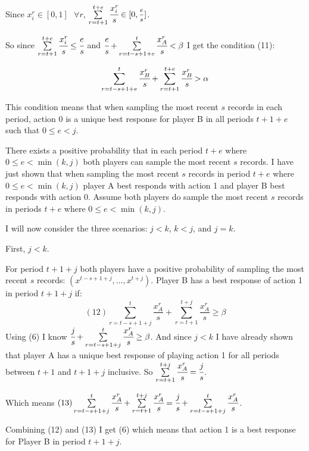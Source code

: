 \documentclass{article}
\begin{document}
Since $x_i^r \in [0,1] \hspace{8pt} \forall r$, $\sum\limits_{r=t+1}^{t+e} \cfrac{x^r_i}{s} \in [0,\mfrac{e}{s}]$.

So since $\sum\limits_{r=t+1}^{t+e} \cfrac{x^r_i}{s} \leq \cfrac{e}{s}$ and $\cfrac{e}{s}+\sum\limits_{r=t-s+1+e}^{t} \cfrac{x^r_A}{s} < \beta$ I get the condition (11):

$$\sum\limits_{r=t-s+1+e}^{t}\cfrac{x^r_B}{s}+\sum\limits_{r=t+1}^{t+e} \cfrac{x^r_B}{s} > \alpha$$

This condition means that when sampling the most recent $s$ records in each period, action 0 is a unique best response for player B in all periods $t+1+e$ such that $0 \leq e<j$.

\vskip12pt

There exists a positive probability that in each period $t+e$ where $0 \leq e<\min (k,j)$ both players can sample the most recent $s$ records. I have just shown that when sampling the most recent $s$ records in period $t+e$ where $0 \leq e<\min (k,j)$ player A best responds with action 1 and player B best responds with action 0. Assume both players do sample the most recent $s$ records in periods $t+e$ where $0 \leq e<\min (k,j)$.

\vskip12pt

I will now consider the three scenarios: $j<k$, $k<j$, and $j=k$.

\vskip12pt

First, $j<k$. 

\vskip6pt

For period $t+1+j$ both players have a positive probability of sampling the most recent $s$ records: $(x^{t-s+1+j},...,x^{t+j})$. Player B has a best response of action 1 in period $t+1+j$ if:
$$(12) \sum\limits_{r=t-s+1+j}^{t}\frac{x^r_A}{s}+\sum\limits_{r=t+1}^{t+j} \frac{x^r_A}{s} \geq \beta$$
Using (6) I know $\cfrac{j}{s}+\sum\limits_{r=t-s+1+j}^{t}\cfrac{x^r_A}{s} \geq \beta$. And since $j<k$ I have already shown that player A has a unique best response of playing action 1 for all periods between $t+1$ and $t+1+j$ inclusive. So $\sum\limits_{r=t+1}^{t+j} \cfrac{x^r_A}{s}=\cfrac{j}{s}$.

Which means $(13) \sum\limits_{r=t-s+1+j}^{t}\cfrac{x^r_A}{s}+\sum\limits_{r=t+1}^{t+j} \cfrac{x^r_A}{s}=\cfrac{j}{s}+\sum\limits_{r=t-s+1+j}^{t}\cfrac{x^r_A}{s}$.

Combining (12) and (13) I get (6) which means that action 1 is a best response for Player B in period $t+1+j$.
\end{document}
